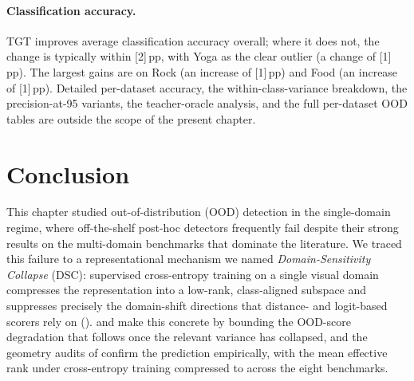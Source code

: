 \paragraph{Classification accuracy.}
TGT improves average classification accuracy overall; where it does not, the change is typically within [2]\,pp, with Yoga as the clear outlier (a change of [1]\,pp). The largest gains are on Rock (an increase of [1]\,pp) and Food (an increase of [1]\,pp). Detailed per-dataset accuracy, the within-class-variance breakdown, the precision-at-95 variants, the teacher-oracle analysis, and the full per-dataset OOD tables are outside the scope of the present chapter.

\section{Conclusion}
\label{sec:dsc:conclusion}

This chapter studied out-of-distribution (OOD) detection in the single-domain regime, where off-the-shelf post-hoc detectors frequently fail despite their strong results on the multi-domain benchmarks that dominate the literature. We traced this failure to a representational mechanism we named \emph{Domain-Sensitivity Collapse} (DSC): supervised cross-entropy training on a single visual domain compresses the representation into a low-rank, class-aligned subspace and suppresses precisely the domain-shift directions that distance- and logit-based scorers rely on ().  and  make this concrete by bounding the OOD-score degradation that follows once the relevant variance has collapsed, and the geometry audits of  confirm the prediction empirically, with the mean effective rank under cross-entropy training compressed to  across the eight benchmarks.

